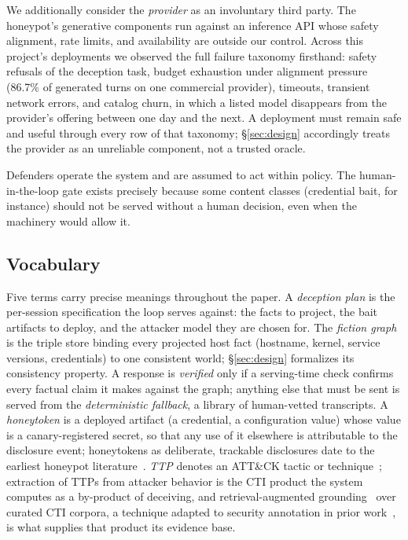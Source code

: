 We additionally consider the \emph{provider} as an involuntary third
party. The honeypot's generative components run against an inference API
whose safety alignment, rate limits, and availability are outside our
control. Across this project's deployments we observed the full failure
taxonomy firsthand: safety refusals of the deception task, budget
exhaustion under alignment pressure (86.7\% of generated turns on one
commercial provider), timeouts, transient network errors, and catalog
churn, in which a listed model disappears from the provider's offering
between one day and the next. A deployment must remain safe and useful
through every row of that taxonomy; \S\ref{sec:design} accordingly treats
the provider as an unreliable component, not a trusted oracle.

Defenders operate the system and are assumed to act within policy. The human-in-the-loop
gate exists precisely because some content classes (credential bait, for
instance) should not be served without a human decision, even when the
machinery would allow it.

\subsection{Vocabulary}
\label{sec:vocab}
Five terms carry precise meanings throughout the paper. A \emph{deception
plan} is the per-session specification the loop serves against: the facts
to project, the bait artifacts to deploy, and the attacker model they are
chosen for. The \emph{fiction graph} is the triple store binding every
projected host fact (hostname, kernel, service versions, credentials) to
one consistent world; \S\ref{sec:design} formalizes its consistency
property. A response is \emph{verified} only if a serving-time check
confirms every factual claim it makes against the graph; anything else
that must be sent is served from the \emph{deterministic fallback}, a
library of human-vetted transcripts. A \emph{honeytoken} is a deployed
artifact (a credential, a configuration value) whose value is a
canary-registered secret, so that any use of it elsewhere is attributable
to the disclosure event; honeytokens as deliberate, trackable
disclosures date to the earliest honeypot literature~\cite{spitzner2003}. \emph{TTP} denotes an ATT\&CK tactic or
technique~\cite{roy2023}; extraction of TTPs from attacker behavior is
the CTI product the system computes as a by-product of deceiving, and
retrieval-augmented grounding~\cite{lewis2020} over curated CTI corpora,
a technique adapted to security annotation in prior
work~\cite{lekssays2025}, is what supplies that product its evidence base.

